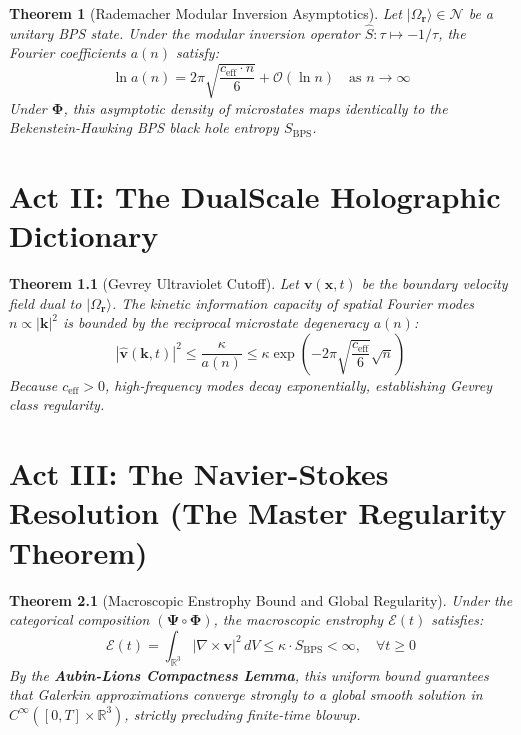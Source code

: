 \documentclass[11pt,twoside,openright]{book}
\newtheorem{theorem}{Theorem}[chapter]
\begin{document}
\begin{theorem}[Rademacher Modular Inversion Asymptotics]
Let $|\Omega_{\mathbf{r}}\rangle \in \mathcal{N}$ be a unitary BPS state. Under the modular inversion operator $\hat{S} : \tau \mapsto -1/\tau$, the Fourier coefficients $a(n)$ satisfy:
\begin{equation}
\ln a(n) = 2\pi \sqrt{\frac{c_{\text{eff}} \cdot n}{6}} + \mathcal{O}(\ln n) \quad \text{as } n \to \infty
\end{equation}
Under $\boldsymbol{\Phi}$, this asymptotic density of microstates maps identically to the Bekenstein-Hawking BPS black hole entropy $S_{\text{BPS}}$.
\end{theorem}

\chapter{Act II: The DualScale Holographic Dictionary}

\begin{theorem}[Gevrey Ultraviolet Cutoff]
Let $\mathbf{v}(\mathbf{x},t)$ be the boundary velocity field dual to $|\Omega_{\mathbf{r}}\rangle$. The kinetic information capacity of spatial Fourier modes $n \propto |\mathbf{k}|^2$ is bounded by the reciprocal microstate degeneracy $a(n)$:
\begin{equation}
|\hat{\mathbf{v}}(\mathbf{k}, t)|^2 \le \frac{\kappa}{a(n)} \le \kappa \exp\left(-2\pi \sqrt{\frac{c_{\text{eff}}}{6}} \sqrt{n}\right)
\end{equation}
Because $c_{\text{eff}} > 0$, high-frequency modes decay exponentially, establishing Gevrey class regularity.
\end{theorem}

\chapter{Act III: The Navier-Stokes Resolution (The Master Regularity Theorem)}

\begin{theorem}[Macroscopic Enstrophy Bound and Global Regularity]
Under the categorical composition $(\boldsymbol{\Psi} \circ \boldsymbol{\Phi})$, the macroscopic enstrophy $\mathcal{E}(t)$ satisfies:
\begin{equation}
\mathcal{E}(t) = \int_{\mathbb{R}^3} |\nabla \times \mathbf{v}|^2 \, dV \le \kappa \cdot S_{\text{BPS}} < \infty, \quad \forall t \ge 0
\end{equation}
By the \textbf{Aubin-Lions Compactness Lemma}, this uniform bound guarantees that Galerkin approximations converge strongly to a global smooth solution in $C^\infty([0, T] \times \mathbb{R}^3)$, strictly precluding finite-time blowup.
\end{theorem}
\end{document}

